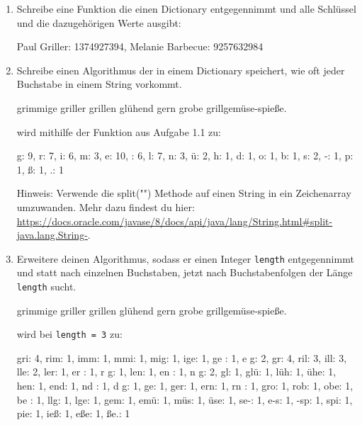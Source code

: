 \documentclass{../../sheet}
\begin{document}
\begin{enumerate}
    \item Schreibe eine Funktion die einen Dictionary entgegennimmt und alle Schlüssel und die dazugehörigen Werte ausgibt:

          \begin{ausgabe}
              Paul Griller: 1374927394, Melanie Barbecue: 9257632984
          \end{ausgabe}

    \item Schreibe einen Algorithmus der in einem Dictionary speichert, wie oft jeder Buchstabe in einem String vorkommt.

          \begin{ausgabe}
              grimmige griller grillen glühend gern grobe grillgemüse-spieße.
          \end{ausgabe}
          wird mithilfe der Funktion aus Aufgabe 1.1 zu:
          \begin{ausgabe}
              g: 9, r: 7, i: 6, m: 3, e: 10,  : 6, l: 7, n: 3, ü: 2, h: 1, d: 1, o: 1, b: 1, s: 2, -: 1, p: 1, ß: 1, .: 1
          \end{ausgabe}

          Hinweis: Verwende die split("") Methode auf einen String in ein Zeichenarray umzuwanden. Mehr dazu findest du hier: \url{https://docs.oracle.com/javase/8/docs/api/java/lang/String.html#split-java.lang.String-}.

    \item Erweitere deinen Algorithmus, sodass er einen Integer \texttt{length} entgegennimmt und statt nach einzelnen Buchstaben, jetzt nach Buchstabenfolgen der Länge \texttt{length} sucht.

          \begin{ausgabe}
              grimmige griller grillen glühend gern grobe grillgemüse-spieße.
          \end{ausgabe}
          wird bei \texttt{length = 3} zu:
          \begin{ausgabe}
              gri: 4, rim: 1, imm: 1, mmi: 1, mig: 1, ige: 1, ge : 1, e g: 2,  gr: 4, ril: 3, ill: 3, lle: 2, ler: 1, er : 1, r g: 1, len: 1, en : 1, n g: 2,  gl: 1, glü: 1, lüh: 1, ühe: 1, hen: 1, end: 1, nd : 1, d g: 1,  ge: 1, ger: 1, ern: 1, rn : 1, gro: 1, rob: 1, obe: 1, be : 1, llg: 1, lge: 1, gem: 1, emü: 1, müs: 1, üse: 1, se-: 1, e-s: 1, -sp: 1, spi: 1, pie: 1, ieß: 1, eße: 1, ße.: 1
          \end{ausgabe}

\end{enumerate}
\end{document}

